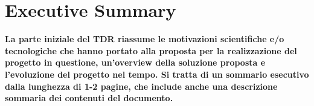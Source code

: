 \section{Executive Summary}
\label{sec:ExecutiveSummary}

{\bf \color{red} La parte iniziale del TDR riassume le motivazioni scientifiche e/o tecnologiche che hanno portato alla proposta per la realizzazione del progetto in questione, un’overview della soluzione proposta e l’evoluzione del progetto nel tempo. Si tratta di un sommario esecutivo dalla lunghezza di 1-2 pagine, che include anche una descrizione sommaria dei contenuti del documento.}
